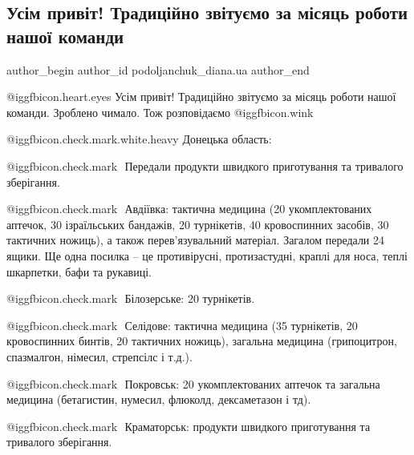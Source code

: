  
 
 
 
 
 
\subsection{Усім привіт! Традиційно звітуємо за місяць роботи нашої команди}
\label{sec:18_11_2022.fb.podoljanchuk_diana.ua.1.zvit}
 
\ifcmt
 author_begin
   author_id podoljanchuk_diana.ua
 author_end
\fi

@igg{fbicon.heart.eyes} Усім привіт! Традиційно звітуємо за місяць роботи нашої команди. Зроблено
чимало. Тож розповідаємо  @igg{fbicon.wink}  

@igg{fbicon.check.mark.white.heavy} ️Донецька область:

@igg{fbicon.check.mark} ️ Передали продукти швидкого приготування та тривалого зберігання.

 @igg{fbicon.check.mark} ️ Авдіївка: тактична медицина (20 укомплектованих аптечок, 30 ізраїльських
бандажів, 20 турнікетів, 40 кровоспинних засобів, 30 тактичних ножиць),  а
також перев'язувальний матеріал. Загалом передали 24 ящики. Ще одна посилка –
це противірусні, протизастудні, краплі для носа, теплі шкарпетки, бафи та
рукавиці. 

 @igg{fbicon.check.mark} ️ Білозерське: 20 турнікетів.

 @igg{fbicon.check.mark} ️ Селідове: тактична медицина (35 турнікетів, 20 кровоспинних бинтів, 20
тактичних ножиць), загальна медицина (грипоцитрон, спазмалгон, німесил,
стрепсілс і т.д.).

 @igg{fbicon.check.mark} ️ Покровськ: 20 укомплектованих аптечок та загальна медицина (бетагистин,
нумесил, флюколд, дексаметазон і тд).

 @igg{fbicon.check.mark} ️ Краматорськ: продукти швидкого приготування та тривалого зберігання.

